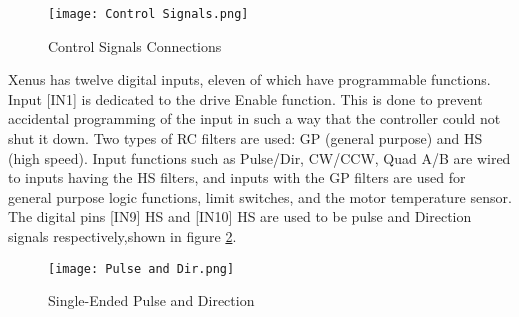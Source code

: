 \begin{figure}[H]
    \centering
    \texttt{[image: Control Signals.png]}
    \caption{Control Signals Connections}
    \label{fig:Control Signals}
    
\end{figure}
Xenus has twelve digital inputs, eleven of which have programmable functions. Input [IN1] is dedicated to the drive Enable function. 
This is done to prevent accidental programming of the input in such a way that the controller could not shut it down.
Two types of RC filters are used: GP (general purpose) and HS (high speed). Input functions such as Pulse/Dir, CW/CCW, Quad A/B are 
wired to inputs having the HS filters, and inputs with the GP filters are used for general purpose logic functions, limit switches, and the 
motor temperature sensor. 
The digital pins [IN9] HS and [IN10] HS are used to be pulse and Direction signals respectively,shown in figure \ref{fig:Single-Ended Pulse and Direction}.

\begin{figure}[H]
    \centering
    \texttt{[image: Pulse and Dir.png]}
    \caption{Single-Ended Pulse and Direction}
    \label{fig:Single-Ended Pulse and Direction}
    
\end{figure}


